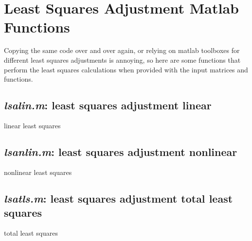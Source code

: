 \section{Least Squares Adjustment Matlab Functions}
Copying the same code over and over again, or relying on matlab toolboxes for different least squares adjustments is annoying, so here are some functions that perform the least squares calculations when provided with the input matrices and functions.

\subsection{\textit{lsalin.m}: \textbf{l}east \textbf{s}quares \textbf{a}djustment \textbf{lin}ear}
linear least squares

\subsection{\textit{lsanlin.m}: \textbf{l}east \textbf{s}quares \textbf{a}djustment \textbf{n}on\textbf{lin}ear}
nonlinear least squares

\subsection{\textit{lsatls.m}: \textbf{l}east \textbf{s}quares \textbf{a}djustment \textbf{t}otal \textbf{l}east \textbf{s}quares}
total least squares
